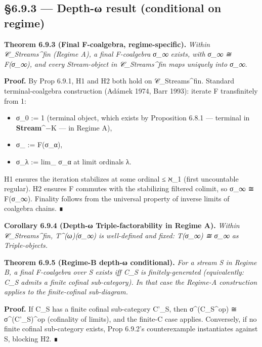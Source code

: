 \documentclass[11pt, openany]{book}
\begin{document}
\subsection{§6.9.3 --- Depth-ω result (conditional on regime)}

\textbf{Theorem 6.9.3 (Final F-coalgebra, regime-specific).} \textit{Within 𝒞\_\allowbreak{}Streams\textasciicircum{}{fin} (Regime A), a final F-coalgebra σ\_\allowbreak{}∞ exists, with σ\_\allowbreak{}∞ ≅ F(σ\_\allowbreak{}∞), and every Stream-object in 𝒞\_\allowbreak{}Streams\textasciicircum{}{fin} maps uniquely into σ\_\allowbreak{}∞.}

\textbf{Proof.} By Prop 6.9.1, H1 and H2 both hold on 𝒞\_\allowbreak{}Streams\textasciicircum{}{fin}. Standard terminal-coalgebra construction (Adámek 1974, Barr 1993): iterate F transfinitely from 1:

\begin{itemize}
\item σ\_\allowbreak{}0 := 1 (terminal object, which exists by Proposition 6.8.1 --- terminal in \textbf{Stream}\textasciicircum{}{−K} --- in Regime A),
\item σ\_ := F(σ\_\allowbreak{}α),
\item σ\_\allowbreak{}λ := lim\_ σ\_\allowbreak{}α at limit ordinals λ.
\end{itemize}

H1 ensures the iteration stabilizes at some ordinal ≤ ℵ\_\allowbreak{}1 (first uncountable regular). H2 ensures F commutes with the stabilizing filtered colimit, so σ\_\allowbreak{}∞ ≅ F(σ\_\allowbreak{}∞). Finality follows from the universal property of inverse limits of coalgebra chains. ∎

\textbf{Corollary 6.9.4 (Depth-ω Triple-factorability in Regime A).} \textit{Within 𝒞\_\allowbreak{}Streams\textasciicircum{}{fin}, T\textasciicircum{}(ω)(σ\_\allowbreak{}∞) is well-defined and fixed: T(σ\_\allowbreak{}∞) ≅ σ\_\allowbreak{}∞ as Triple-objects.}

\textbf{Theorem 6.9.5 (Regime-B depth-ω conditional).} \textit{For a stream S in Regime B, a final F-coalgebra over S exists iff C\_\allowbreak{}S is finitely-generated (equivalently: C\_\allowbreak{}S admits a finite cofinal sub-category). In that case the Regime-A construction applies to the finite-cofinal sub-diagram.}

\textbf{Proof.} If C\_\allowbreak{}S has a finite cofinal sub-category C'\_\allowbreak{}S, then σ\textasciicircum{}(C\_\allowbreak{}S\textasciicircum{}op) ≅ σ\textasciicircum{}(C'\_\allowbreak{}S)\textasciicircum{}op (cofinality of limits), and the finite-C case applies. Conversely, if no finite cofinal sub-category exists, Prop 6.9.2's counterexample instantiates against S, blocking H2. ∎
\end{document}
